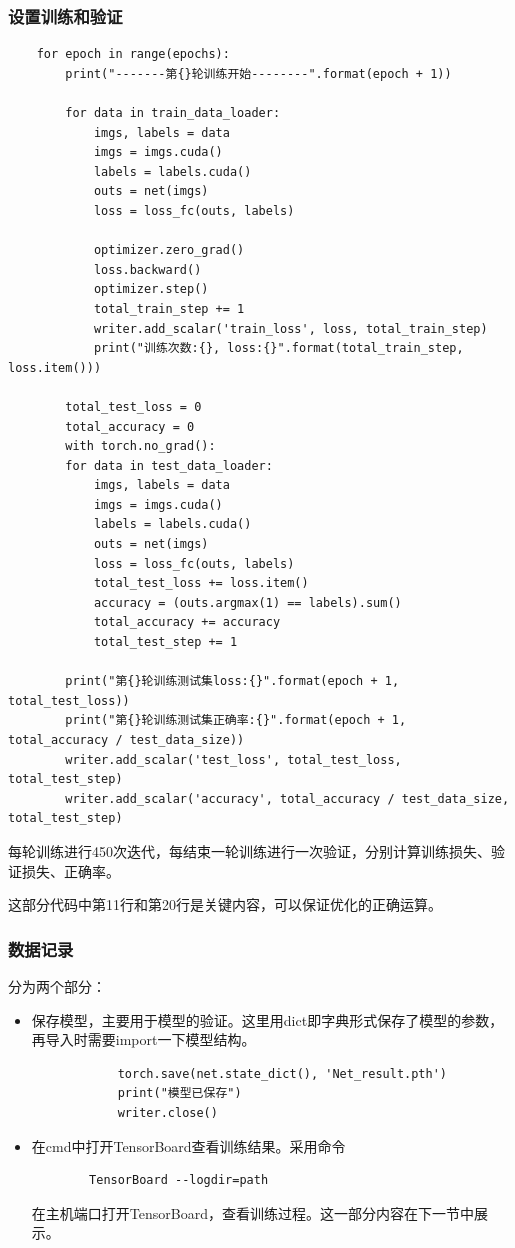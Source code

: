 \documentclass{article}
\begin{document}
	\subsubsection{设置训练和验证}
	
	\begin{lstlisting}
	for epoch in range(epochs):
		print("-------第{}轮训练开始--------".format(epoch + 1))
		
		for data in train_data_loader:
			imgs, labels = data
			imgs = imgs.cuda()
			labels = labels.cuda()
			outs = net(imgs)
			loss = loss_fc(outs, labels)
		
			optimizer.zero_grad()
			loss.backward()
			optimizer.step()
			total_train_step += 1
			writer.add_scalar('train_loss', loss, total_train_step)
			print("训练次数:{}, loss:{}".format(total_train_step, loss.item()))
		
		total_test_loss = 0
		total_accuracy = 0
		with torch.no_grad():
		for data in test_data_loader:
			imgs, labels = data
			imgs = imgs.cuda()
			labels = labels.cuda()
			outs = net(imgs)
			loss = loss_fc(outs, labels)
			total_test_loss += loss.item()
			accuracy = (outs.argmax(1) == labels).sum()
			total_accuracy += accuracy
			total_test_step += 1
			
		print("第{}轮训练测试集loss:{}".format(epoch + 1, total_test_loss))
		print("第{}轮训练测试集正确率:{}".format(epoch + 1, total_accuracy / test_data_size))
		writer.add_scalar('test_loss', total_test_loss, total_test_step)
		writer.add_scalar('accuracy', total_accuracy / test_data_size, total_test_step)
	\end{lstlisting}

	每轮训练进行450次迭代，每结束一轮训练进行一次验证，分别计算训练损失、验证损失、正确率。
	
	这部分代码中第11行和第20行是关键内容，可以保证优化的正确运算。
	
	\subsubsection{数据记录}
	
	分为两个部分：
	\begin{itemize}
		\item
		保存模型，主要用于模型的验证。这里用dict即字典形式保存了模型的参数，再导入时需要import一下模型结构。
		\begin{lstlisting}
			torch.save(net.state_dict(), 'Net_result.pth')
			print("模型已保存")
			writer.close()
		\end{lstlisting}
	
		\item 
		在cmd中打开TensorBoard查看训练结果。采用命令
		\begin{lstlisting}
		TensorBoard --logdir=path
		\end{lstlisting}
		在主机端口打开TensorBoard，查看训练过程。这一部分内容在下一节中展示。
	\end{itemize}
\end{document}
